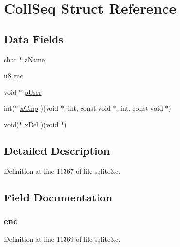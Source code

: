 \hypertarget{struct_coll_seq}{}\section{Coll\+Seq Struct Reference}
\label{struct_coll_seq}
\subsection*{Data Fields}
\begin{DoxyCompactItemize}
\item 
char $\ast$ \hyperlink{struct_coll_seq_a661118d86ac4127d40bf3be78d92117d}{z\+Name}
\item 
\hyperlink{sqlite3_8c_a74a0f6424ae628af25f23f0a35f6ead3}{u8} \hyperlink{struct_coll_seq_a9c71ab1f0d39a2b088a6d8a1093159c0}{enc}
\item 
void $\ast$ \hyperlink{struct_coll_seq_afcecb2add875c6162c0c6874d2c50faa}{p\+User}
\item 
int($\ast$ \hyperlink{struct_coll_seq_ac2aa268873ec86c0965eee3dba777096}{x\+Cmp} )(void $\ast$, int, const void $\ast$, int, const void $\ast$)
\item 
void($\ast$ \hyperlink{struct_coll_seq_ad2185e5192b0df27c6a55ba9b65c94c2}{x\+Del} )(void $\ast$)
\end{DoxyCompactItemize}


\subsection{Detailed Description}


Definition at line 11367 of file sqlite3.\+c.



\subsection{Field Documentation}
\hypertarget{struct_coll_seq_a9c71ab1f0d39a2b088a6d8a1093159c0}{}
\subsubsection[{enc}]{ enc}\label{struct_coll_seq_a9c71ab1f0d39a2b088a6d8a1093159c0}


Definition at line 11369 of file sqlite3.\+c.

\hypertarget{struct_coll_seq_afcecb2add875c6162c0c6874d2c50faa}{}
